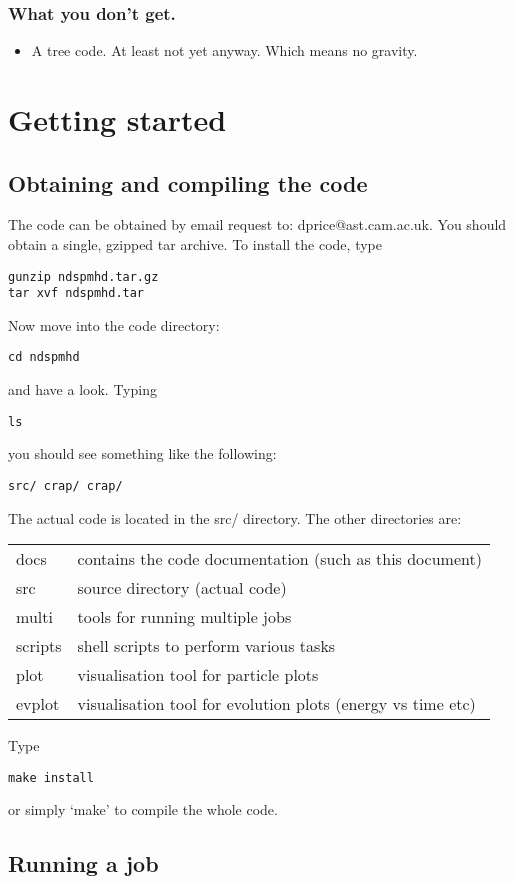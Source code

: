 \documentclass[a4paper,12pt]{article}
\begin{document}
\subsubsection{What you don't get.}
\begin{itemize}
\item A tree code. At least not yet anyway. Which means no gravity.
\end{itemize}

\section{Getting started}

\subsection{Obtaining and compiling the code}
The code can be obtained by email request to: dprice@ast.cam.ac.uk. You
should obtain a single, gzipped tar archive. To install the code, type
\begin{verbatim}
gunzip ndspmhd.tar.gz
tar xvf ndspmhd.tar
\end{verbatim}
Now move into the code directory:
\begin{verbatim}
cd ndspmhd
\end{verbatim}
and have a look. Typing
\begin{verbatim}
ls
\end{verbatim}
 you should see something like the following:
\begin{verbatim}
src/ crap/ crap/
\end{verbatim}
The actual code is located in the src/ directory. The other
directories are:
\begin{tabular}{ll}
docs & contains the code documentation (such as this document) \\
src & source directory (actual code)\\
multi & tools for running multiple jobs\\
scripts & shell scripts to perform various tasks\\
plot & visualisation tool for particle plots\\
evplot & visualisation tool for evolution plots (energy vs time etc)
\end{tabular}
Type
\begin{verbatim}
make install
\end{verbatim}
or simply `make' to compile the whole
code. 

\subsection{Running a job}
\end{document}
